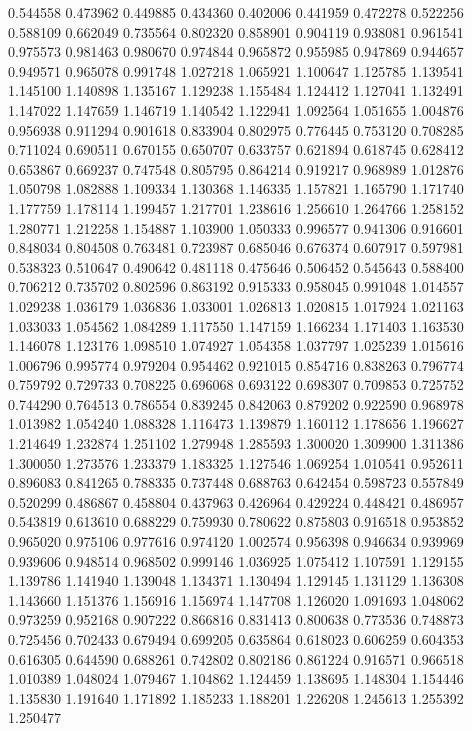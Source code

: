 0.544558
0.473962
0.449885
0.434360
0.402006
0.441959
0.472278
0.522256
0.588109
0.662049
0.735564
0.802320
0.858901
0.904119
0.938081
0.961541
0.975573
0.981463
0.980670
0.974844
0.965872
0.955985
0.947869
0.944657
0.949571
0.965078
0.991748
1.027218
1.065921
1.100647
1.125785
1.139541
1.145100
1.140898
1.135167
1.129238
1.155484
1.124412
1.127041
1.132491
1.147022
1.147659
1.146719
1.140542
1.122941
1.092564
1.051655
1.004876
0.956938
0.911294
0.901618
0.833904
0.802975
0.776445
0.753120
0.708285
0.711024
0.690511
0.670155
0.650707
0.633757
0.621894
0.618745
0.628412
0.653867
0.669237
0.747548
0.805795
0.864214
0.919217
0.968989
1.012876
1.050798
1.082888
1.109334
1.130368
1.146335
1.157821
1.165790
1.171740
1.177759
1.178114
1.199457
1.217701
1.238616
1.256610
1.264766
1.258152
1.280771
1.212258
1.154887
1.103900
1.050333
0.996577
0.941306
0.916601
0.848034
0.804508
0.763481
0.723987
0.685046
0.676374
0.607917
0.597981
0.538323
0.510647
0.490642
0.481118
0.475646
0.506452
0.545643
0.588400
0.706212
0.735702
0.802596
0.863192
0.915333
0.958045
0.991048
1.014557
1.029238
1.036179
1.036836
1.033001
1.026813
1.020815
1.017924
1.021163
1.033033
1.054562
1.084289
1.117550
1.147159
1.166234
1.171403
1.163530
1.146078
1.123176
1.098510
1.074927
1.054358
1.037797
1.025239
1.015616
1.006796
0.995774
0.979204
0.954462
0.921015
0.854716
0.838263
0.796774
0.759792
0.729733
0.708225
0.696068
0.693122
0.698307
0.709853
0.725752
0.744290
0.764513
0.786554
0.839245
0.842063
0.879202
0.922590
0.968978
1.013982
1.054240
1.088328
1.116473
1.139879
1.160112
1.178656
1.196627
1.214649
1.232874
1.251102
1.279948
1.285593
1.300020
1.309900
1.311386
1.300050
1.273576
1.233379
1.183325
1.127546
1.069254
1.010541
0.952611
0.896083
0.841265
0.788335
0.737448
0.688763
0.642454
0.598723
0.557849
0.520299
0.486867
0.458804
0.437963
0.426964
0.429224
0.448421
0.486957
0.543819
0.613610
0.688229
0.759930
0.780622
0.875803
0.916518
0.953852
0.965020
0.975106
0.977616
0.974120
1.002574
0.956398
0.946634
0.939969
0.939606
0.948514
0.968502
0.999146
1.036925
1.075412
1.107591
1.129155
1.139786
1.141940
1.139048
1.134371
1.130494
1.129145
1.131129
1.136308
1.143660
1.151376
1.156916
1.156974
1.147708
1.126020
1.091693
1.048062
0.973259
0.952168
0.907222
0.866816
0.831413
0.800638
0.773536
0.748873
0.725456
0.702433
0.679494
0.699205
0.635864
0.618023
0.606259
0.604353
0.616305
0.644590
0.688261
0.742802
0.802186
0.861224
0.916571
0.966518
1.010389
1.048024
1.079467
1.104862
1.124459
1.138695
1.148304
1.154446
1.135830
1.191640
1.171892
1.185233
1.188201
1.226208
1.245613
1.255392
1.250477
